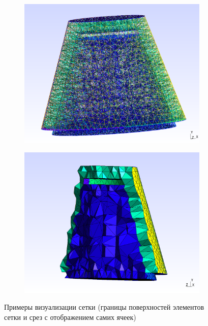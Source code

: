 \documentclass[a4paper, 14pt]{extreport}
\begin{document}
\begin{figure}[H]
	\begin{subfigure}[h]{0.5\textwidth}
		\includegraphics[scale=0.23]{pictures/mesh_surfaces_edges_full.png}
	\end{subfigure}
	\begin{subfigure}[h]{0.5\textwidth}
		\includegraphics[scale=0.23]{pictures/mesh_volumes_slice.png}
	\end{subfigure}
	\caption{Примеры визуализации сетки (границы поверхностей элементов сетки и срез с отображением самих ячеек)}
	\label{fig: mesh_display}
\end{figure}
\end{document}
